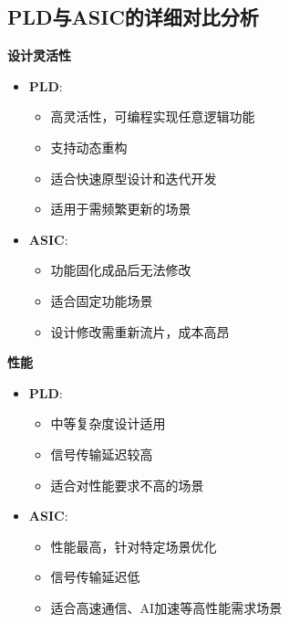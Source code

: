 \documentclass{beamer}
\providecommand{\tightlist}{%
  \setlength{\itemsep}{0pt}\setlength{\parskip}{0pt}}
\begin{document}
\subsection{PLD与ASIC的详细对比分析}
\begin{frame}{\textbf{设计灵活性}}
\begin{itemize}
\tightlist
\item
    \textbf{PLD}:

    \begin{itemize}
    \tightlist
    \item
    高灵活性，可编程实现任意逻辑功能\\
    \item
    支持动态重构\\
    \item
    适合快速原型设计和迭代开发\\
    \item
    适用于需频繁更新的场景\\
    \end{itemize}
\item
    \textbf{ASIC}:

    \begin{itemize}
    \tightlist
    \item
    功能固化成品后无法修改\\
    \item
    适合固定功能场景\\
    \item
    设计修改需重新流片，成本高昂
    \end{itemize}
\end{itemize}
\end{frame}

\begin{frame}{\textbf{性能}}

\begin{itemize}
\tightlist
\item
    \textbf{PLD}:

    \begin{itemize}
    \tightlist
    \item
    中等复杂度设计适用\\
    \item
    信号传输延迟较高\\
    \item
    适合对性能要求不高的场景\\
    \end{itemize}
\item
    \textbf{ASIC}:

    \begin{itemize}
    \tightlist
    \item
    性能最高，针对特定场景优化\\
    \item
    信号传输延迟低\\
    \item
    适合高速通信、AI加速等高性能需求场景
    \end{itemize}
\end{itemize}
\end{frame}
\end{document}
